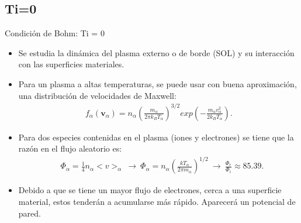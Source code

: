\documentclass[11pt]{beamer}
\begin{document}
    \subsection{Ti=0}
        \begin{frame}{Condici\'on de Bohm: Ti = 0}
            \fontsize{8pt}{10}\selectfont
        
        \begin{itemize}
            \item Se estudia la dinámica del plasma externo o de borde (SOL) y su interacción con las superficies materiales. 
            \item Para un plasma a altas temperaturas, se puede usar con buena aproximación, una distribución de velocidades de Maxwell:
            \begin{align*}
	        f_{\alpha}\left(\mathbf{v}_{\alpha}\right) = n_{\alpha}\left(\frac{m_{\alpha}}{2\pi k_BT_{\alpha}}\right)^{3/2}exp\left(-\frac{m_{\alpha}v_{\alpha}^2}{2k_BT_{\alpha}}\right).
	        \end{align*}
            \item Para dos especies contenidas en el plasma (iones y electrones) se tiene que la razón en el flujo aleatorio es:
             \begin{align*}
            &\Phi_{\alpha} = \frac{1}{4}n_{\alpha}<v>_{\alpha} \ \rightarrow  \ \Phi_{\alpha} = n_{\alpha} \left( \frac{kT_{\alpha}}{2\pi m_{\alpha}} \right)^{1/2} \ \rightarrow \ \frac{\Phi_{e}}{\Phi_{i}} \approx 85.39.
            \end{align*}
            \item Debido a que se tiene un mayor flujo de electrones, cerca a una superficie material, estos tenderán a acumularse más rápido. Aparecerá un potencial de pared.
        \end{itemize}
        \end{frame}
        
\end{document}
